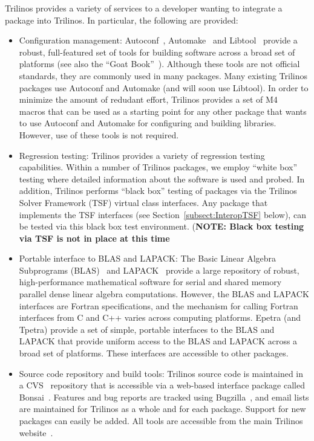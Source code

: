 \documentclass[12pt,relax]{SANDreport}
\begin{document}
Trilinos provides a variety of services to a developer wanting to
integrate a package into Trilinos.  In particular, the following are
provided:
\begin{itemize}
\item Configuration management:
Autoconf~\cite{Autoconf},  Automake~\cite{Automake} and
Libtool~\cite{Libtool} provide a robust, full-featured set of tools for
building software across a broad set of platforms (see also the ``Goat
Book''~\cite{GoatBook}).  Although these
tools are not official standards, they are commonly used in many
packages.  Many existing
Trilinos packages use Autoconf and Automake (and will soon use
Libtool). In order to
minimize the amount of redudant effort, Trilinos provides a set of
M4~\cite{M4} macros that can be used as a starting point for any other
package that wants to use Autoconf and Automake for configuring and
building libraries.  However, use of these tools is not required.

\item Regression testing: Trilinos provides a variety of regression
testing capabilities.  Within a number of Trilinos packages, we employ
``white box'' testing where detailed information about the software is
used and probed.  In addition, Trilinos performs ``black box'' testing
of packages via the Trilinos Solver Framework (TSF) virtual class
interfaces.  Any package that implements the TSF interfaces (see
Section~\ref{subsect:InteropTSF} below), can be tested via this black box
test environment.  ({\bf NOTE: Black box testing via TSF is not in
place at this time}


\item Portable interface to BLAS and LAPACK: The Basic Linear Algebra
Subprograms (BLAS)~\cite{BLAS1,BLAS2,BLAS3} and LAPACK~\cite{lapack}
provide a large repository of robust, high-performance mathematical
software for serial and shared memory parallel dense linear algebra
computations.  However, the BLAS and LAPACK interfaces are Fortran
specifications, and the mechanism for calling Fortran interfaces from
C and C++ varies across computing platforms.  Epetra (and Tpetra)
provide a set of simple, portable interfaces to the BLAS and LAPACK
that provide uniform access to the BLAS and LAPACK across a broad
set of platforms.  These interfaces are accessible to
other packages.

\item Source code repository and build tools: Trilinos source code is
maintained in a CVS~\cite{CVS} repository that is accessible via a
web-based interface package called Bonsai~\cite{Bonsai}.  Features and bug reports
are tracked using Bugzilla~\cite{Bugzilla}, and email lists are
maintained for Trilinos as a whole and for each package.  Support for new
packages can easily be added.  All tools are accessible from the main
Trilinos website~\cite{Trilinos-home-page}.

\end{itemize}
\end{document}
